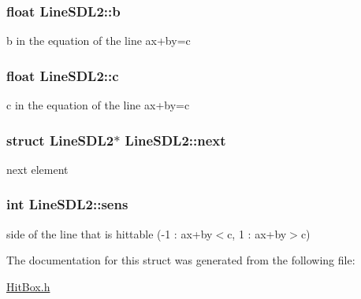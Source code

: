 \subsubsection[{\texorpdfstring{b}{b}}]{\setlength{\rightskip}{0pt plus 5cm}float Line\+S\+D\+L2\+::b}\hypertarget{structLineSDL2_ac5d6441cec617729d6a89ecaa81e84f8}{}\label{structLineSDL2_ac5d6441cec617729d6a89ecaa81e84f8}
b in the equation of the line ax+by=c 
\subsubsection[{\texorpdfstring{c}{c}}]{\setlength{\rightskip}{0pt plus 5cm}float Line\+S\+D\+L2\+::c}\hypertarget{structLineSDL2_afe58519a94706033c6dd8bd68c5f66a8}{}\label{structLineSDL2_afe58519a94706033c6dd8bd68c5f66a8}
c in the equation of the line ax+by=c 
\subsubsection[{\texorpdfstring{next}{next}}]{\setlength{\rightskip}{0pt plus 5cm}struct {\bf Line\+S\+D\+L2}$\ast$ Line\+S\+D\+L2\+::next}\hypertarget{structLineSDL2_a97e5c096a263e55935fda7808dd62fc3}{}\label{structLineSDL2_a97e5c096a263e55935fda7808dd62fc3}
next element 
\subsubsection[{\texorpdfstring{sens}{sens}}]{\setlength{\rightskip}{0pt plus 5cm}int Line\+S\+D\+L2\+::sens}\hypertarget{structLineSDL2_af3899a41b666d9aa2281ae1bc833d5e7}{}\label{structLineSDL2_af3899a41b666d9aa2281ae1bc833d5e7}
side of the line that is hittable (-\/1 \+: ax+by$<$c, 1 \+: ax+by$>$c) 

The documentation for this struct was generated from the following file\+:\begin{DoxyCompactItemize}
\item 
\hyperlink{HitBox_8h}{Hit\+Box.\+h}\end{DoxyCompactItemize}
